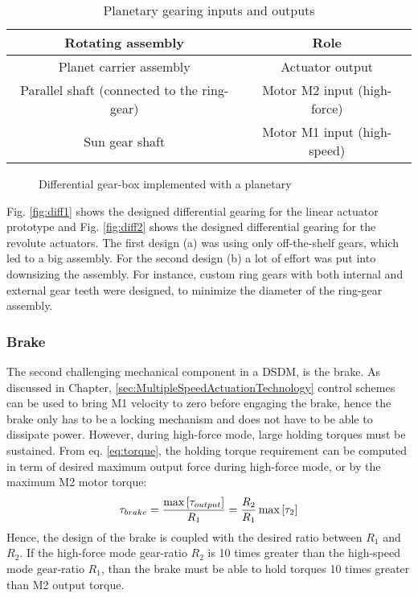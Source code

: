\begin{table}[htbp]
	\centering
		\begin{tabular}{ c c }
			\hline
			Rotating assembly & Role \\
			\hline \hline
			Planet carrier assembly & Actuator output \\
			Parallel shaft (connected to the ring-gear) & Motor M2 input (high-force) \\
			Sun gear shaft          & Motor M1 input (high-speed) \\
			\hline
		\end{tabular}
	\caption{Planetary gearing inputs and outputs}
	\label{tab:PlanetaryGearingInputsAndOutput}
\end{table}

\begin{figure}[htp]
        \centering
				\hspace{+5pt}
        \caption{Differential gear-box implemented with a planetary}
				\label{fig:differnentials}
\end{figure}

Fig. \ref{fig:diff1} shows the designed differential gearing for the linear actuator prototype and Fig. \ref{fig:diff2} shows the designed differential gearing for the revolute actuators. The first design (a) was using only off-the-shelf gears, which led to a big assembly. For the second design (b) a lot of effort was put into downsizing the assembly. For instance, custom ring gears with both internal and external gear teeth were designed, to minimize the diameter of the ring-gear assembly.

\subsubsection{Brake}

The second challenging mechanical component in a DSDM, is the brake. As discussed in Chapter, \ref{sec:MultipleSpeedActuationTechnology} control schemes can be used to bring M1 velocity to zero before engaging the brake, hence the brake only has to be a locking mechanism and does not have to be able to dissipate power. However, during high-force mode, large holding torques must be sustained. From eq. \eqref{eq:torque}, the holding torque requirement can be computed in term of desired maximum output force during high-force mode, or by the maximum M2 motor torque: 
%
\begin{align}
	\tau_{brake} = \frac{ \operatornamewithlimits{max} \left[ \tau_{output} \right] }{R_1} = \frac{ R_2 }{ R_1 } \operatornamewithlimits{max} \left[  \tau_2 \right]
	\label{eq:brakelim}
\end{align}
%
Hence, the design of the brake is coupled with the desired ratio between $R_1$ and $R_2$. If the high-force mode gear-ratio $R_2$ is 10 times greater than the high-speed mode gear-ratio $R_1$, than the brake must be able to hold torques 10 times greater than M2 output torque. 

